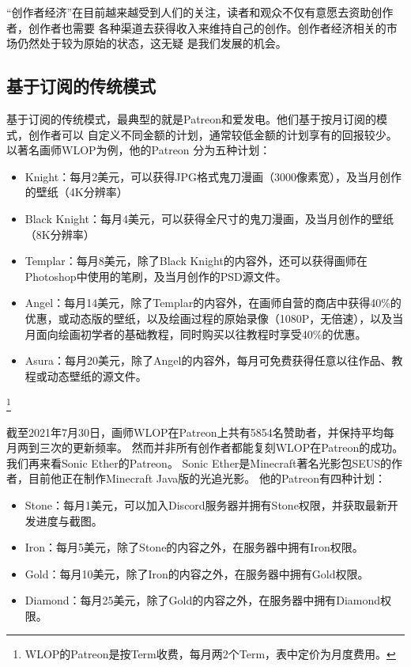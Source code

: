 \documentclass[11pt,UTF8,a4paper]{ctexart}
\begin{document}
    “创作者经济”在目前越来越受到人们的关注，读者和观众不仅有意愿去资助创作者，创作者也需要
    各种渠道去获得收入来维持自己的创作。创作者经济相关的市场仍然处于较为原始的状态，这无疑
    是我们发展的机会。

    \subsection{基于订阅的传统模式}\label{subsec:tradition_patreon}

    基于订阅的传统模式，最典型的就是Patreon和爱发电。他们基于按月订阅的模式，创作者可以
    自定义不同金额的计划，通常较低金额的计划享有的回报较少。以著名画师WLOP为例，他的Patreon
    分为五种计划\cite{wlop_patreon}：
    \begin{itemize}
        \item Knight：每月2美元，可以获得JPG格式鬼刀漫画（3000像素宽），及当月创作的壁纸（4K分辨率）
        \item Black Knight：每月4美元，可以获得全尺寸的鬼刀漫画，及当月创作的壁纸（8K分辨率）
        \item Templar：每月8美元，除了Black Knight的内容外，还可以获得画师在Photoshop中使用的笔刷，及当月创作的PSD源文件。
        \item Angel：每月14美元，除了Templar的内容外，在画师自营的商店中获得40\%的优惠，或动态版的壁纸，以及绘画过程的原始录像（1080P，无倍速），以及当月面向绘画初学者的基础教程，同时购买以往教程时享受40\%的优惠。
        \item Asura：每月20美元，除了Angel的内容外，每月可免费获得任意以往作品、教程或动态壁纸的源文件。
    \end{itemize}\footnote{WLOP的Patreon是按Term收费，每月两2个Term，表中定价为月度费用。}

    截至2021年7月30日，画师WLOP在Patreon上共有5854名赞助者，并保持平均每月两到三次的更新频率。
    然而并非所有创作者都能复刻WLOP在Patreon的成功。 我们再来看Sonic Ether的Patreon。
    Sonic Ether是Minecraft著名光影包SEUS的作者，目前他正在制作Minecraft Java版的光追光影。
    他的Patreon有四种计划\cite{seus_patreon}：
    \begin{itemize}
        \item Stone：每月1美元，可以加入Discord服务器并拥有Stone权限，并获取最新开发进度与截图。
        \item Iron：每月5美元，除了Stone的内容之外，在服务器中拥有Iron权限。
        \item Gold：每月10美元，除了Iron的内容之外，在服务器中拥有Gold权限。
        \item Diamond：每月25美元，除了Gold的内容之外，在服务器中拥有Diamond权限。
    \end{itemize}
\end{document}
